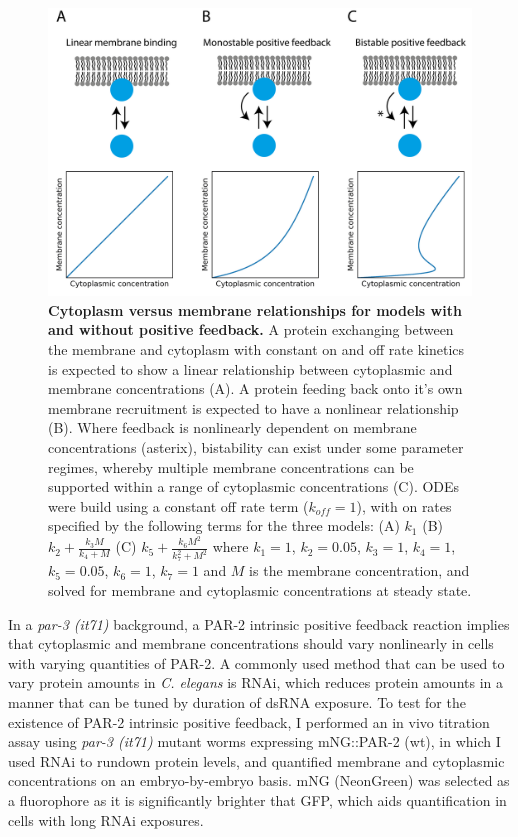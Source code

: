 \documentclass[12pt]{"report"}
\newcommand{\mycaption}[2]{\caption[#1]{\textbf{#1.} #2}}
\begin{document}
\begin{figure}[!h]
\includegraphics[scale=0.95]{rundown_schematic}
\setlength{\abovecaptionskip}{20pt}
\centering
\mycaption{Cytoplasm versus membrane relationships for models with and without positive feedback}{
A protein exchanging between the membrane and cytoplasm with constant on and off rate kinetics is expected to show a linear relationship between cytoplasmic and membrane concentrations (A).
A protein feeding back onto it's own membrane recruitment is expected to have a nonlinear relationship (B).
Where feedback is nonlinearly dependent on membrane concentrations (asterix), bistability can exist under some parameter regimes, whereby multiple membrane concentrations can be supported within a range of cytoplasmic concentrations (C).
ODEs were build using a constant off rate term ($k_{off} = 1$), with on rates specified by the following terms for the three models: (A) $k_1$ (B) $k_2 + \frac{k_3 M}{k_4 + M} $ (C) $k_5 + \frac{k_6 M^2}{k_7^2 + M^2}$ where $k_1 = 1$, $k_2 = 0.05$, $k_3 = 1$, $k_4 = 1$, $k_5 = 0.05$, $k_6 = 1$, $k_7 = 1$ and $M$ is the membrane concentration, and solved for membrane and cytoplasmic concentrations at steady state. 
}
\label{fig:rundown_schematic}
\end{figure}

In a \textit{par-3 (it71)} background, a PAR-2 intrinsic positive feedback reaction implies that cytoplasmic and membrane concentrations should vary nonlinearly in cells with varying quantities of PAR-2. A commonly used method that can be used to vary protein amounts in \textit{C. elegans} is RNAi, which reduces protein amounts in a manner that can be tuned by duration of dsRNA exposure. To test for the existence of PAR-2 intrinsic positive feedback, I performed an in vivo titration assay using \textit{par-3 (it71)} mutant worms expressing mNG::PAR-2 (wt), in which I used RNAi to rundown protein levels, and quantified membrane and cytoplasmic concentrations on an embryo-by-embryo basis. mNG (NeonGreen) was selected as a fluorophore as it is significantly brighter that GFP, which aids quantification in cells with long RNAi exposures.\\
\end{document}
